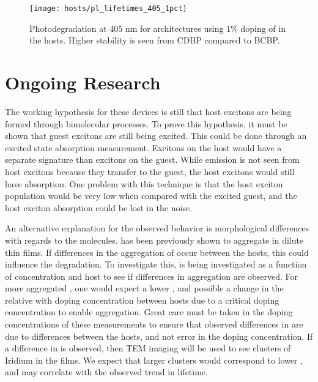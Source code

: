 \documentclass[../thesis.tex]{subfiles}
\begin{document}
\begin{figure}[ht]
\centering
\texttt{[image: hosts/pl\_lifetimes\_405\_1pct]}
\caption{Photodegradation at 405 nm for architectures using 1\% doping of \irppy in the hosts. Higher stability is seen from CDBP compared to BCBP. }
\label{fig:hosts_pl405_1pct}
\end{figure}

\section{Ongoing Research}


The working hypothesis for these devices is still that host excitons are being formed through bimolecular processes.
To prove this hypothesis, it must be shown that guest excitons are still being excited.
This could be done through an excited state absorption measurement.\supercite{Laming1988,Ichimura1987}
Excitons on the host would have a separate signature than excitons on the guest.
While emission is not seen from host excitons because they transfer to the guest, the host excitons would still have absorption.
One problem with this technique is that the host exciton population would be very low when compared with the excited guest, and the host exciton absorption could be lost in the noise.

An alternative explanation for the observed behavior is morphological differences with regards to the \irppy molecules.
\irppy has been previously shown to aggregate in dilute thin films.\supercite{Reineke2009}
If differences in the aggregation of \irppy occur between the hosts, this could influence the degradation.
To investigate this, \pl is being investigated as a function of concentration and host to see if differences in aggregation are observed.
For more aggregated \irppy, one would expect a lower \pl, and possible a change in the relative \pl with doping concentration between hosts due to a critical doping concentration to enable aggregation.
Great care must be taken in the doping concentrations of these measurements to ensure that observed differences in \pl are due to differences between the hosts, and not error in the doping concentration.
If a difference in \pl is observed, then TEM imaging will be used to see clusters of Iridium in the films.
We expect that larger clusters would correspond to lower \pl, and may correlate with the observed trend in lifetime.

\end{document}
